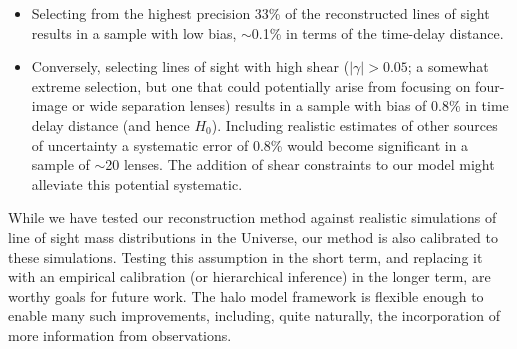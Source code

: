 \documentclass[useAMS,usenatbib,a4paper]{mn2e}
\begin{document}
\begin{itemize}
\item Selecting from the highest precision 33\% of the reconstructed lines of
sight results in a sample with low bias, $\sim$0.1\% in terms of the
time-delay distance. 

\item Conversely, selecting lines of sight with high shear ($|\gamma| > 0.05$; 
a somewhat extreme selection, but one that  could potentially arise from 
focusing on four-image or wide separation lenses) results in a sample with
bias of 0.8\% in time delay distance (and hence $H_0$). Including realistic estimates of other
sources of uncertainty a systematic error of 0.8\% would become significant in
a sample of $\sim$20 lenses. The addition of shear constraints to our model might
alleviate this potential systematic.


\end{itemize}





While we have tested our reconstruction method against realistic simulations
of line of sight mass distributions in the Universe, our method is also 
calibrated to these simulations. Testing this assumption in the short term,
and replacing it with an empirical calibration (or hierarchical inference) in
the longer term, are worthy goals for future work. The halo model framework is
flexible enough to enable many such improvements, including, quite naturally,
the incorporation of more information from observations. 
\end{document}
